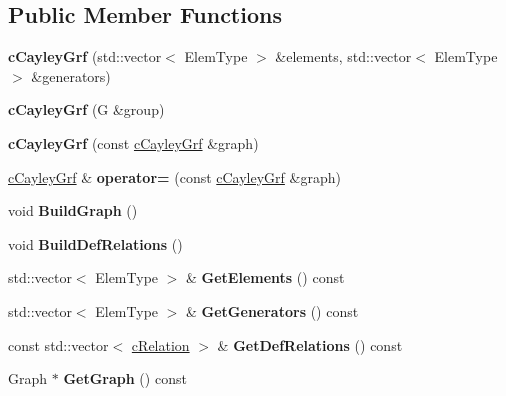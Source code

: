\subsection*{\-Public \-Member \-Functions}
\begin{DoxyCompactItemize}
\item 
\hypertarget{classcCayleyGrf_ac94c0ddf2262aab4ce17454fb10e7286}{
{\bfseries c\-Cayley\-Grf} (std\-::vector$<$ \-Elem\-Type $>$ \&elements, std\-::vector$<$ \-Elem\-Type $>$ \&generators)}
\label{classcCayleyGrf_ac94c0ddf2262aab4ce17454fb10e7286}

\item 
\hypertarget{classcCayleyGrf_a6f1bc787dd952aae0b5e5d4d6d39fe35}{
{\bfseries c\-Cayley\-Grf} (\-G \&group)}
\label{classcCayleyGrf_a6f1bc787dd952aae0b5e5d4d6d39fe35}

\item 
\hypertarget{classcCayleyGrf_ae597aa2fce821346c6f3976e70eb6a75}{
{\bfseries c\-Cayley\-Grf} (const \hyperlink{classcCayleyGrf}{c\-Cayley\-Grf} \&graph)}
\label{classcCayleyGrf_ae597aa2fce821346c6f3976e70eb6a75}

\item 
\hypertarget{classcCayleyGrf_a31a02f7a0e7702fe953409f7f82888be}{
\hyperlink{classcCayleyGrf}{c\-Cayley\-Grf} \& {\bfseries operator=} (const \hyperlink{classcCayleyGrf}{c\-Cayley\-Grf} \&graph)}
\label{classcCayleyGrf_a31a02f7a0e7702fe953409f7f82888be}

\item 
\hypertarget{classcCayleyGrf_a4a0ff02aa7bb9d556456b34e9f66f3d9}{
void {\bfseries \-Build\-Graph} ()}
\label{classcCayleyGrf_a4a0ff02aa7bb9d556456b34e9f66f3d9}

\item 
\hypertarget{classcCayleyGrf_a8517436f6101a294fa7f30355efaa196}{
void {\bfseries \-Build\-Def\-Relations} ()}
\label{classcCayleyGrf_a8517436f6101a294fa7f30355efaa196}

\item 
\hypertarget{classcCayleyGrf_a91d254c855766847a3624403cf9144f2}{
std\-::vector$<$ \-Elem\-Type $>$ \& {\bfseries \-Get\-Elements} () const }
\label{classcCayleyGrf_a91d254c855766847a3624403cf9144f2}

\item 
\hypertarget{classcCayleyGrf_aa79022e7605d3630cdbacf069301e1d3}{
std\-::vector$<$ \-Elem\-Type $>$ \& {\bfseries \-Get\-Generators} () const }
\label{classcCayleyGrf_aa79022e7605d3630cdbacf069301e1d3}

\item 
\hypertarget{classcCayleyGrf_ae6e48ed5970d0b1f3a045666b18dfdb3}{
const std\-::vector$<$ \hyperlink{classcRelation}{c\-Relation} $>$ \& {\bfseries \-Get\-Def\-Relations} () const }
\label{classcCayleyGrf_ae6e48ed5970d0b1f3a045666b18dfdb3}

\item 
\hypertarget{classcCayleyGrf_aeb4d8533b65921ca63fdaaf4516f92f6}{
\-Graph $\ast$ {\bfseries \-Get\-Graph} () const }
\label{classcCayleyGrf_aeb4d8533b65921ca63fdaaf4516f92f6}

\end{DoxyCompactItemize}

